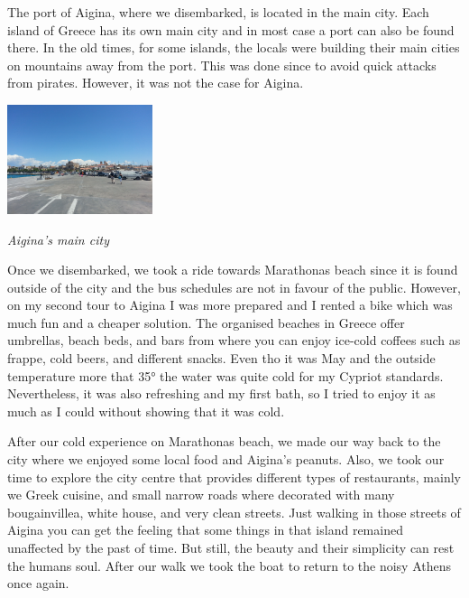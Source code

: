 \documentclass[10pt,a4paper]{article} %
\begin{document}
\begin{multicols}{3}
The port of Aigina, where we disembarked, is located in the main city. 
Each island of Greece has its own main city and in most case a port can also be 
found there. 
In the old times, for some islands, the locals were building their main cities 
on mountains away from the port. 
This was done since to avoid quick attacks from pirates. 
However, it was not the case for Aigina. 


\begin{center}
	\includegraphics[width=0.32\textwidth]{media/aigina_1.jpg}
	\par\textit{Aigina's main city}
\end{center}


Once we disembarked, we took a ride towards Marathonas beach since it is found 
outside of the city and the bus schedules are not in favour of the public. 
However, on my second tour to Aigina I was more prepared and I rented a bike which 
was much fun and a cheaper solution.
The organised beaches in Greece offer umbrellas, beach beds, and bars from where 
you can enjoy ice-cold coffees such as frappe, cold beers, and different snacks. 
Even tho it was May and the outside temperature more that \ang{35} the water was 
quite cold for my Cypriot standards. 
Nevertheless, it was also refreshing and my first bath, so I tried to enjoy it 
as much as I could without showing that it was cold. 


After our cold experience on Marathonas beach, we made our way back to the city 
where we enjoyed some local food and Aigina's peanuts. 
Also, we took our time to explore the city centre that provides different types of 
restaurants, mainly we Greek cuisine,  and small narrow roads where decorated with 
many bougainvillea, white house, and very clean streets. 
Just walking in those streets of Aigina you can get the feeling that some things 
in that island remained unaffected by the past of time. 
But still, the beauty and their simplicity can rest the humans soul. 
After our walk we took the boat to return to the noisy Athens once again.



\end{multicols}
\end{document}

